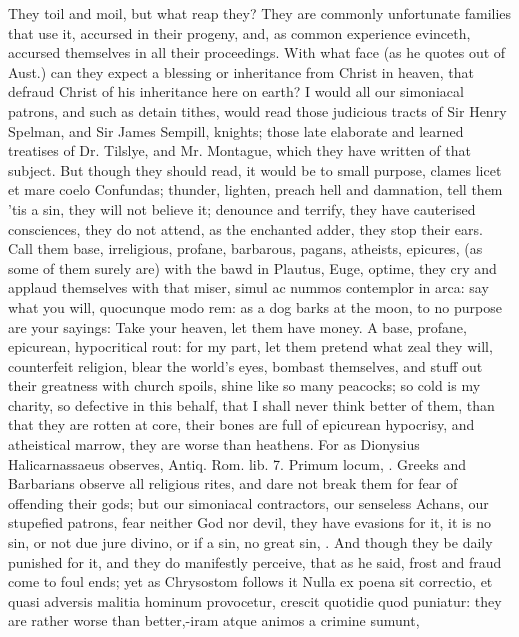 {They toil and moil, but what reap they? They are commonly unfortunate
families that use it, accursed in their pro\-geny, and, as common
experience evinceth, accursed themselves in all their proceedings. With
what face (as he quotes out of Aust.) can they expect a blessing
or inheritance from Christ in heaven, that defraud Christ of his
inheritance here on earth? I would all our simoniacal patrons, and such
as detain tithes, would read those judicious tracts of Sir Henry
Spelman, and Sir James Sempill, knights; those late elaborate and
learned treatises of Dr. Tilslye, and Mr. Montague, which they have
written of that subject. But though they should read, it would be to
small purpose, clames licet et mare coelo Confundas; thunder, lighten,
preach hell and damnation, tell them 'tis a sin, they will not believe
it; denounce and terrify, they have cauterised consciences, they
do not attend, as the enchanted adder, they stop their ears. Call them
base, irreligious, profane, barbarous, pagans, atheists, epicures, (as
some of them surely are) with the bawd in Plautus, Euge, optime, they
cry and applaud themselves with that miser, simul ac nummos
contemplor in arca: say what you will, quocunque modo rem: as a dog
barks at the moon, to no purpose are your sayings: Take your heaven,
let them have money. A base, profane, epicurean, hypocritical rout: for
my part, let them pretend what zeal they will, counterfeit religion,
blear the world's eyes, bombast themselves, and stuff out their
greatness with church spoils, shine like so many peacocks; so cold is
my charity, so defective in this behalf, that I shall never think
better of them, than that they are rotten at core, their bones are full
of epicurean hypocrisy, and atheistical marrow, they are worse than
heathens. For as Dionysius Halicarnassaeus observes, Antiq. Rom. lib.
7. Primum locum, \etc{}. Greeks and Barbarians observe all religious
rites, and dare not break them for fear of offending their gods; but
our simoniacal contractors, our senseless Achans, our stupefied
patrons, fear neither God nor devil, they have evasions for it, it is
no sin, or not due jure divino, or if a sin, no great sin, \etc{}. And
though they be daily punished for it, and they do manifestly perceive,
that as he said, frost and fraud come to foul ends; yet as
Chrysostom follows it Nulla ex poena sit correctio, et quasi
adversis malitia hominum provocetur, crescit quotidie quod puniatur:
they are rather worse than better,-iram atque animos a crimine sumunt,
}

